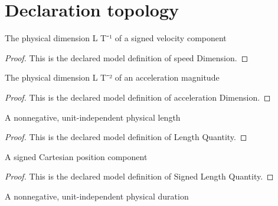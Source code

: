 \section{Declaration topology}
\begin{definition}
  \label{def:physics:phyx-mini-0742:phyxminiproblems-problemphyxmini0742-speeddimension}
  The physical dimension L T⁻¹ of a signed velocity component
\end{definition}
\begin{proof}
  This is the declared model definition of speed Dimension.
\end{proof}
\begin{definition}
  \label{def:physics:phyx-mini-0742:phyxminiproblems-problemphyxmini0742-accelerationdimension}
  The physical dimension L T⁻² of an acceleration magnitude
\end{definition}
\begin{proof}
  This is the declared model definition of acceleration Dimension.
\end{proof}
\begin{definition}
  \label{def:physics:phyx-mini-0742:phyxminiproblems-problemphyxmini0742-lengthquantity}
  A nonnegative, unit-independent physical length
\end{definition}
\begin{proof}
  This is the declared model definition of Length Quantity.
\end{proof}
\begin{definition}
  \label{def:physics:phyx-mini-0742:phyxminiproblems-problemphyxmini0742-signedlengthquantity}
  A signed Cartesian position component
\end{definition}
\begin{proof}
  This is the declared model definition of Signed Length Quantity.
\end{proof}
\begin{definition}
  \label{def:physics:phyx-mini-0742:phyxminiproblems-problemphyxmini0742-timequantity}
  A nonnegative, unit-independent physical duration
\end{definition}
